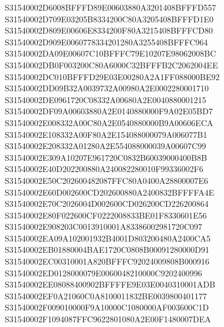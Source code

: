 \documentclass[12pt,a4paper]{article}
\begin{document}
\begin{framed}
{S31540002D6008BFFFD89E00603880A3201408BFFFD557\newline
S31540002D709E03205B8334200C80A3205408BFFFD1E0\newline
S31540002D809E00606E8334200F80A3215408BFFFCD80\newline
S31540002D909E0060778334201280A3255408BFFFC964\newline
S31540002DA09E00607C10BFFFC79E10207E98062008BC\newline
S31540002DB0F003200C80A6000C32BFFFB2C2062004EE\newline
S31540002DC010BFFFD29E03E00280A2A1FF088000BE92\newline
S31540002DD09B32A0039732A00980A2E0002280001710\newline
S31540002DE0961720C08332A00680A2E0040880001215\newline
S31540002DF09A00603880A2E0140880000F9A02E05BD7\newline
S31540002E008332A00C80A2E0540880000B9A00606ECA\newline
S31540002E108332A00F80A2E154088000079A006077B1\newline
S31540002E208332A01280A2E554088000039A00607C99\newline
S31540002E309A10207E961720C0832B60039000400B8B\newline
S31540002E40D202200880A240082280010F99336002F6\newline
S31540002E50C202600482087FFC80A0400A28800007E6\newline
S31540002E60D002600CD202600880A2400832BFFFFA4E\newline
S31540002E70C2026004D002600CD026200CD226200864\newline
S31540002E80F022600CF0222008833BE01F8330601E56\newline
S31540002E908203C0013910001A83386002981720C097\newline
S31540002EA09A102001932B4001D803200480A2400CA5\newline
S31540002EB01880004BAE1720C0808B00091280000D91\newline
S31540002EC00310001A820BFFFC92024009808B000916\newline
S31540002ED0128000079E0060048210000C9202400996\newline
S31540002EE08088400902BFFFFE9E03E0040310001ADB\newline
S31540002EF0A21060C0A8100011832BE0039800401177\newline
S31540002F009010000F9A10000C1080000AF003600C1D\newline
S31540002F1094087FFC9622801080A2E00F1480007DEA\newline
}
\end{framed}
\end{document}
